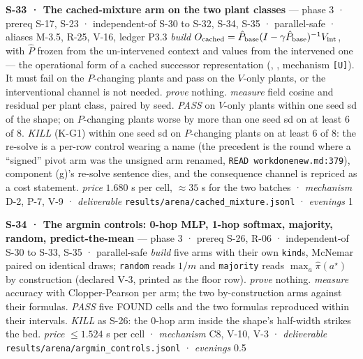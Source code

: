 \documentclass[11pt,a4paper]{article}
\theoremstyle{plain}
\theoremstyle{definition}
\theoremstyle{remark}
\begin{document}
\textbf{S-33 · The cached-mixture arm on the two plant classes} ---
phase 3 · prereq S-17, S-23 · independent-of S-30 to S-32, S-34, S-35 ·
parallel-safe · aliases M-3.5, R-25, V-16, ledger P3.3 \emph{build}
\(O_{\rm cached}=\hat P_{\rm base}(I-\gamma\hat P_{\rm base})^{-1}V_{\rm int}\),
with \(\hat P\) frozen from the un-intervened context and values from
the intervened one --- the operational form of a cached successor
representation (\citep{momennejad-2017-sr},
\citep{russek-2017-predictive}, mechanism \texttt{{[}U{]}}). It must
fail on the \(P\)-changing plants and pass on the \(V\)-only plants, or
the interventional channel is not needed. \emph{prove} nothing.
\emph{measure} field cosine and residual per plant class, paired by
seed. \emph{PASS} on \(V\)-only plants within one seed sd of the shape;
on \(P\)-changing plants worse by more than one seed sd on at least 6 of
8. \emph{KILL} (K-G1) within one seed sd on \(P\)-changing plants on at
least 6 of 8: the re-solve is a per-row control wearing a name (the
precedent is the round where a ``signed'' pivot arm was the unsigned arm
renamed, \texttt{READ\ workdonenew.md:379}), component (g)'s re-solve
sentence dies, and the consequence channel is repriced as a cost
statement. \emph{price} \(1.680\) s per cell, \(\approx35\) s for the
two batches · \emph{mechanism} D-2, P-7, V-9 · \emph{deliverable}
\texttt{results/arena/cached\_mixture.jsonl} · \emph{evenings} 1

\textbf{S-34 · The argmin controls: 0-hop MLP, 1-hop softmax, majority,
random, predict-the-mean} --- phase 3 · prereq S-26, R-06 ·
independent-of S-30 to S-33, S-35 · parallel-safe \emph{build} five arms
with their own \texttt{kind}s, McNemar paired on identical draws;
\texttt{random} reads \(1/m\) and \texttt{majority} reads
\(\max_a\hat\pi(a^\star)\) by construction (declared V-3, printed as the
floor row). \emph{prove} nothing. \emph{measure} accuracy with
Clopper-Pearson per arm; the two by-construction arms against their
formulas. \emph{PASS} five FOUND cells and the two formulas reproduced
within their intervals. \emph{KILL} as S-26: the 0-hop arm inside the
shape's half-width strikes the bed. \emph{price} \(\le1.524\) s per cell
· \emph{mechanism} C8, V-10, V-3 · \emph{deliverable}
\texttt{results/arena/argmin\_controls.jsonl} · \emph{evenings} 0.5
\end{document}
